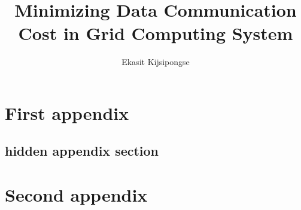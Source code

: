 \documentclass{muthesis09}
\title{Minimizing Data Communication Cost in Grid Computing System}
\author{Ekasit Kijsipongse}
\begin{document}
\maketitle





\thaiabstract{
}

\tableofcontents
\listoftables %
\listoffigures













\appendices

\chapter{First appendix}
\section*{hidden appendix section}   %

\chapter{Second appendix}






\biography %
\end{document}
